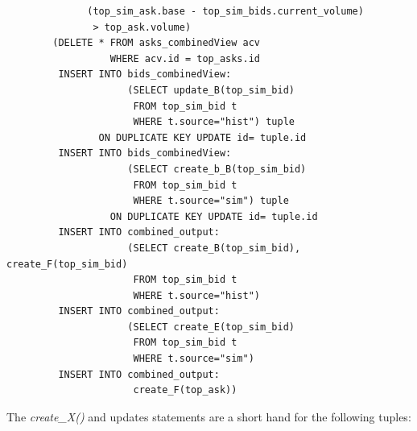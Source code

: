 \documentclass{article}
\begin{document}
\begin{verbatim}
              (top_sim_ask.base - top_sim_bids.current_volume)
               > top_ask.volume)              
        (DELETE * FROM asks_combinedView acv
                  WHERE acv.id = top_asks.id
         INSERT INTO bids_combinedView: 
                     (SELECT update_B(top_sim_bid)
                      FROM top_sim_bid t
                      WHERE t.source="hist") tuple
                ON DUPLICATE KEY UPDATE id= tuple.id
         INSERT INTO bids_combinedView: 
                     (SELECT create_b_B(top_sim_bid)
                      FROM top_sim_bid t
                      WHERE t.source="sim") tuple
                  ON DUPLICATE KEY UPDATE id= tuple.id
         INSERT INTO combined_output:
                     (SELECT create_B(top_sim_bid), create_F(top_sim_bid)
                      FROM top_sim_bid t
                      WHERE t.source="hist")
         INSERT INTO combined_output:
                     (SELECT create_E(top_sim_bid)
                      FROM top_sim_bid t
                      WHERE t.source="sim")
         INSERT INTO combined_output:
                      create_F(top_ask))      
\end{verbatim}

The \emph{create\_X()} and {updates} statements are a short hand for the following tuples:
\end{document}
